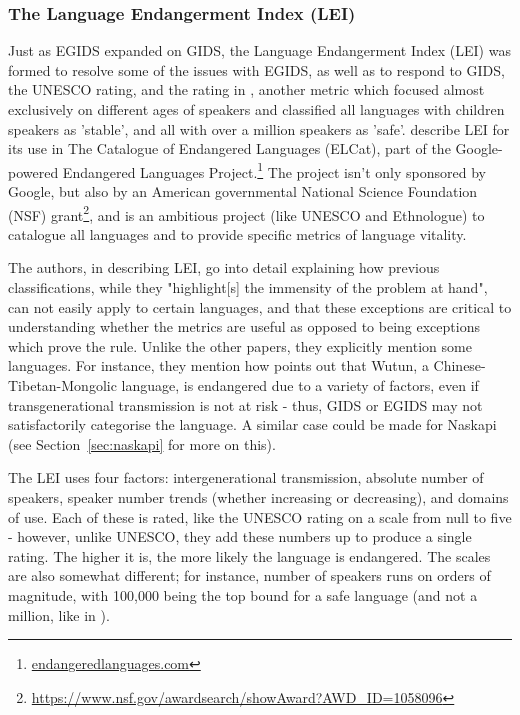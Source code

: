 \subsubsection{The Language Endangerment Index (LEI)}

Just as EGIDS expanded on GIDS, the Language Endangerment Index (LEI) was formed to resolve some of the issues with EGIDS, as well as to respond to GIDS, the UNESCO rating, and the rating in \citet{krauss2007classification}, another metric which focused almost exclusively on different ages of speakers and classified all languages with children speakers as 'stable', and all with over a million speakers as 'safe'. \citet{lee2016assessing} describe LEI for its use in The Catalogue of Endangered Languages (ELCat), part of the Google-powered Endangered Languages Project.\footnote{\href{endangeredlanguages.com}{endangeredlanguages.com}} The project isn't only sponsored by Google, but also by an American governmental National Science Foundation (NSF) grant\footnote{\href{https://www.nsf.gov/awardsearch/showAward?AWD\_ID=1058096}{https://www.nsf.gov/awardsearch/showAward?AWD\_ID=1058096}}, and is an ambitious project (like UNESCO and Ethnologue) to catalogue all languages and to provide specific metrics of language vitality.

The authors, in describing LEI, go into detail explaining how previous classifications, while they "highlight[s] the immensity of the problem at hand", can not easily apply to certain languages, and that these exceptions are critical to understanding whether the metrics are useful as opposed to being exceptions which prove the rule. Unlike the other papers, they explicitly mention some languages. For instance, they mention how \citet{dwyer2012tools} points out that Wutun, a Chinese-Tibetan-Mongolic language, is endangered due to a variety of factors, even if transgenerational transmission is not at risk - thus, GIDS or EGIDS may not satisfactorily categorise the language. A similar case could be made for Naskapi (see Section~\ref{sec:naskapi} for more on this).

The LEI uses four factors: intergenerational transmission, absolute number of speakers, speaker number trends (whether increasing or decreasing), and domains of use. Each of these is rated, like the UNESCO rating on a scale from null to five - however, unlike UNESCO, they add these numbers up to produce a single rating. The higher it is, the more likely the language is endangered. The scales are also somewhat different; for instance, number of speakers runs on orders of magnitude, with 100,000 being the top bound for a safe language (and not a million, like in \citet{krauss2007classification}).

